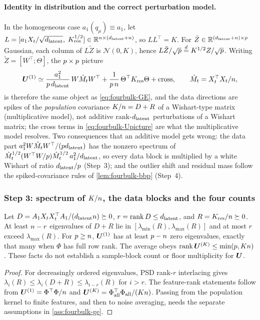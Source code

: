 \paragraph{Identity in distribution and the correct perturbation model.}
In the homogeneous case $a_1(q_\mu)\equiv a_1$, let $L=[a_1X_t/\sqrt{d_{\mathrm{latent}}},\;K_{\mathrm{res}}^{1/2}]\in\mathbb{R}^{n\times(d_{\mathrm{latent}}+n)}$, so $LL^\top=K$. For $\tilde Z\in\mathbb{R}^{(d_{\mathrm{latent}}+n)\times p}$ Gaussian, each column of $L\tilde Z$ is $\mathcal N(0,K)$, hence $L\tilde Z/\sqrt{p}\overset d=K^{1/2}Z/\sqrt{p}$. Writing $\tilde Z=[W^\top;\Theta]$, the $p\times p$ picture
\begin{equation}\label{eq:fourbulk-Upicture}
  \bm{U}^{(1)}\simeq\frac{a_1^2}{p\,d_{\mathrm{latent}}}\,W\hat M_tW^\top+\frac{1}{p\,n}\,\Theta^\top K_{\mathrm{res}}\Theta+\text{cross},\qquad \hat M_t=X_t^\top X_t/n,
\end{equation}
is therefore the same object as \eqref{eq:fourbulk-GE}, and the data directions are spikes of the \emph{population} covariance $K/n=D+R$ of a Wishart-type matrix (multiplicative model), not additive rank-$d_{\mathrm{latent}}$ perturbations of a Wishart matrix; the cross terms in \eqref{eq:fourbulk-Upicture} are what the multiplicative model resolves. Two consequences that an additive model gets wrong: the data part $a_1^2W\hat M_tW^\top/(pd_{\mathrm{latent}})$ has the nonzero spectrum of $\hat M_t^{1/2}(W^\top W/p)\hat M_t^{1/2}\,a_1^2/d_{\mathrm{latent}}$, so every data block is multiplied by a white Wishart of ratio $d_{\mathrm{latent}}/p$ (Step~3); and the outlier shift and residual mass follow the spiked-covariance rules of \cref{lem:fourbulk-bbp} (Step~4).

\subsubsection{Step 3: spectrum of $K/n$, the data blocks and the four counts}

\begin{lemma}\label{lem:fourbulk-counts}
Let $D=A_1X_tX_t^\top A_1/(d_{\mathrm{latent}}n)\succeq0$, $r=\operatorname{rank}D\le d_{\mathrm{latent}}$, and $R=K_{\mathrm{res}}/n\succeq0$. At least $n-r$ eigenvalues of $D+R$ lie in $[\lambda_{\min}(R),\lambda_{\max}(R)]$ and at most $r$ exceed $\lambda_{\max}(R)$. For $p\ge n$, $\bm{U}^{(1)}$ has at least $p-n$ zero eigenvalues, exactly that many when $\Phi$ has full row rank. The average obeys $\operatorname{rank}\bm{U}^{(K)}\le\min(p,Kn)$. These facts do not establish a sample-block count or floor multiplicity for $\bm{U}$.
\end{lemma}
\begin{proof}
For decreasingly ordered eigenvalues, PSD rank-$r$ interlacing gives $\lambda_i(R)\le\lambda_i(D+R)\le\lambda_{i-r}(R)$ for $i>r$. The feature-rank statements follow from $\bm{U}^{(1)}=\Phi^\top\Phi/n$ and $\bm{U}^{(K)}=\Phi_{\rm all}^\top\Phi_{\rm all}/(Kn)$. Passing from the population kernel to finite features, and then to noise averaging, needs the separate assumptions in \cref{ass:fourbulk-ge}.
\end{proof}

